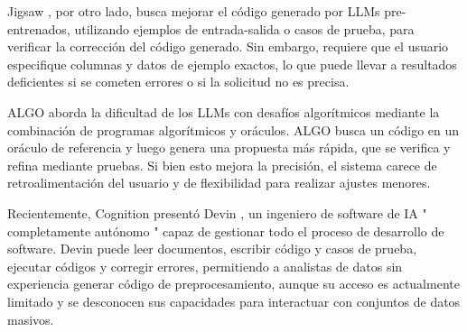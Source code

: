 Jigsaw \cite{jigsaw}, por otro lado, busca mejorar el código generado por LLMs pre-entrenados, utilizando ejemplos de entrada-salida o casos de prueba, para verificar la corrección del código generado. Sin embargo, requiere que el usuario especifique columnas y datos de ejemplo exactos, lo que puede llevar a resultados deficientes si se cometen errores o si la solicitud no es precisa.

ALGO \cite{algo} aborda la dificultad de los LLMs con desafíos algorítmicos mediante la combinación de programas algorítmicos y oráculos. ALGO busca un código en un oráculo de referencia y luego genera una propuesta más rápida, que se verifica y refina mediante pruebas. Si bien esto mejora la precisión, el sistema carece de retroalimentación del usuario y de flexibilidad para realizar ajustes menores.

Recientemente, Cognition presentó Devin \cite{devin}, un ingeniero de software de IA " completamente autónomo " capaz de gestionar todo el proceso de desarrollo de software. Devin puede leer documentos, escribir código y casos de prueba, ejecutar códigos y corregir errores, permitiendo a analistas de datos sin experiencia generar código de preprocesamiento, aunque su acceso es actualmente limitado y se desconocen sus capacidades para interactuar con conjuntos de datos masivos.
